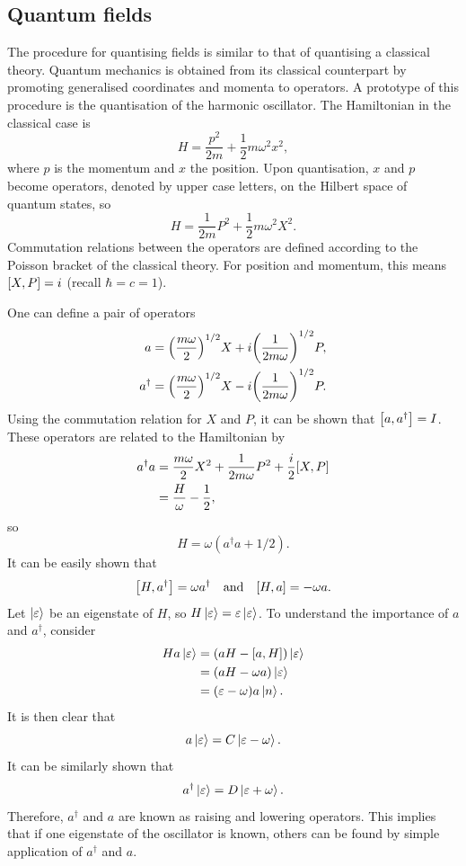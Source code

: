 \subsection{Quantum fields}

The procedure for quantising fields is similar to that of quantising a classical theory. Quantum mechanics is obtained from its classical counterpart by promoting generalised coordinates and momenta to operators. A prototype of this procedure is the quantisation of the harmonic oscillator. The Hamiltonian in the classical case is $$ H = \frac{p^2}{2m} + \frac{1}{2}m\omega^2 x^2,$$ where $p$ is the momentum and $x$ the position. Upon quantisation, $x$ and $p$ become operators, denoted by upper case letters, on the Hilbert space of quantum states, so $$ H = \frac{1}{2m}P^2+\frac{1}{2}m\omega^2 X^2.$$ Commutation relations between the operators are defined according to the Poisson bracket of the classical theory. For position and momentum, this means $\comm{X}{P} = i$ (recall $\hbar = c = 1$).

One can define a pair of operators
\begin{align}
    a &= \qty(\frac{m\omega}{2})^{1/2}X+i\qty(\frac{1}{2m\omega})^{1/2} P, \\
    a^{\dagger} &= \qty(\frac{m\omega}{2})^{1/2}X-i\qty(\frac{1}{2m\omega})^{1/2} P.
\end{align}
Using the commutation relation for $X$ and $P$, it can be shown that $\comm{a}{a^{\dagger}} = I$. These operators are related to the Hamiltonian by
\begin{align*}
    a^{\dagger} a &= \frac{m\omega}{2}X^2+\frac{1}{2m\omega}P^2+\frac{i}{2}\comm{X}{P}\\
    &= \frac{H}{\omega}-\frac{1}{2},
\end{align*}
so
\begin{equation}
    H = \omega(a^{\dagger}a+1/2).
\end{equation}
It can be easily shown that $$\comm{H}{a^{\dagger}} = \omega a^{\dagger}\qand \comm{H}{a} = -\omega a.$$ Let $\ket{\varepsilon}$ be an eigenstate of $H$, so $H\ket{\varepsilon} = \varepsilon \ket{\varepsilon}$. To understand the importance of $a$ and $a^{\dagger}$, consider
\begin{align*}
    Ha\ket{\varepsilon} &= (aH-\comm{a}{H})\ket{\varepsilon}\\
    &= (aH-\omega a)\ket{\varepsilon}\\
    &= (\varepsilon-\omega) a\ket{n}.
\end{align*}
It is then clear that $$ a\ket{\varepsilon} = C\ket{\varepsilon-\omega}.$$ It can be similarly shown that $$ a^{\dagger}\ket{\varepsilon} = D\ket{\varepsilon+\omega}.$$ Therefore, $a^{\dagger}$ and $a$ are known as raising and lowering operators. This implies that if one eigenstate of the oscillator is known, others can be found by simple application of $a^{\dagger}$ and $a$.

